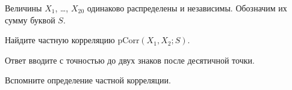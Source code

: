 
\begin{question}
Величины \(X_1\), \ldots, \(X_{20}\) одинаково распределены и независимы.
Обозначим их сумму буквой \(S\).

Найдите частную корреляцию \(\mathrm{pCorr}(X_1, X_2; S)\).

Ответ вводите с точностью до двух знаков после десятичной точки.
\end{question}

\begin{solution}
Вспомните определение частной корреляции.
\end{solution}


